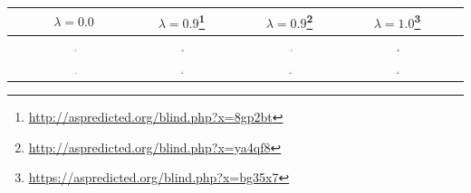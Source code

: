 \documentclass[%
    ,float=false %
    ,preview=true
    ,class=scrartcl
    ]{standalone}
\begin{document}
\small{
\begin{tabular}{|c||c|cc|c|c}
	\hline
& $\lambda = 0.0$
& $\lambda=0.9$\footnote{\url{http://aspredicted.org/blind.php?x=8gp2bt}}
& $\lambda=0.9$\footnote{\url{http://aspredicted.org/blind.php?x=ya4qf8}} 
& $\lambda=1.0$\footnote{\url{https://aspredicted.org/blind.php?x=bg35x7}} 
	\\ \hline \hline 
	\multirow{2}{*}{\raisebox{.5pt}{\textcircled{\raisebox{-.9pt} {1}}}}		  
		&   \multirow{2}{*}{  \includegraphics[width=0.06\textwidth]{../results/correlations/figures/posteriors/posterior_perRelation_Parseability_lifted_case.pdf}   }
 		&   \multirow{2}{*}{  \includegraphics[width=0.06\textwidth]{../results/correlations/figures/posteriors/posterior_first09_Efficiency_lifted_case.pdf}     }  
		&   \multirow{2}{*}{  \includegraphics[width=0.06\textwidth]{../results/correlations/figures/posteriors/posterior_Efficiency_lifted_case.pdf}     }  
		&   \multirow{2}{*}{  \includegraphics[width=0.06\textwidth]{../results/correlations/figures/posteriors/posterior_first10_Efficiency_lifted_case.pdf}     } 
		\\
&&&&\\ \hline
	\multirow{2}{*}{\raisebox{.5pt}{\textcircled{\raisebox{-.9pt} {2}}}}	 
		&   \multirow{2}{*}{  \includegraphics[width=0.06\textwidth]{../results/correlations/figures/posteriors/posterior_perRelation_Parseability_lifted_cop.pdf}   }
		&   \multirow{2}{*}{  \includegraphics[width=0.06\textwidth]{../results/correlations/figures/posteriors/posterior_first09_Efficiency_lifted_cop.pdf}     }  
		&   \multirow{2}{*}{  \includegraphics[width=0.06\textwidth]{../results/correlations/figures/posteriors/posterior_Efficiency_lifted_cop.pdf}     }  
		&   \multirow{2}{*}{  \includegraphics[width=0.06\textwidth]{../results/correlations/figures/posteriors/posterior_first10_Efficiency_lifted_cop.pdf}     }  

\end{tabular}}
\end{document}
